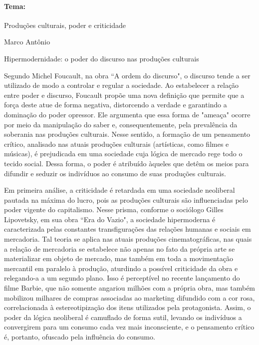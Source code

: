 \documentclass{article}
\begin{document}
\newpage
\paragraph{Tema:} Produções culturais, poder e criticidade

\begin{flushright} Marco Antônio \end{flushright}
 Hipermodernidade: o poder do discurso nas produções culturais


Segundo Michel Foucault, na obra “A ordem do discurso", o discurso tende a ser utilizado de modo a controlar e regular a sociedade. Ao estabelecer a relação entre poder e discurso, Foucault propõe uma nova definição que permite que a força deste atue de forma negativa, distorcendo a verdade e garantindo a dominação do poder opressor. Ele argumenta que essa forma de "ameaça" ocorre por meio da manipulação do saber e, consequentemente, pela prevalência da soberania nas produções culturais. Nesse sentido, a formação de um pensamento crítico, analisado nas atuais produções culturais (artísticas, como filmes e músicas), é prejudicada em uma sociedade cuja lógica de mercado rege todo o tecido social. Dessa forma, o poder é atribuído àqueles que detêm os meios para difundir e seduzir os indivíduos ao consumo de suas produções culturais.

Em primeira análise, a criticidade é retardada em uma sociedade neoliberal pautada na máxima do lucro, pois as produções culturais são influenciadas pelo poder vigente do capitalismo. Nesse prisma, conforme o sociólogo Gilles Lipovetsky, em sua obra “Era do Vazio", a sociedade hipermoderna é caracterizada pelas constantes transfigurações das relações humanas e sociais em mercadoria. Tal teoria se aplica nas atuais produções cinematográficas, nas quais a relação de mercadoria se estabelece não apenas no fato da própria arte se materializar em objeto de mercado, mas também em toda a movimentação mercantil em paralelo à produção, aturdindo a possível criticidade da obra e relegando-a a um segundo plano. Isso é perceptível no recente lançamento do filme Barbie, que não somente angariou milhões com a própria obra, mas também mobilizou milhares de compras associadas ao marketing difundido com a cor rosa, correlacionada à estereotipização dos itens utilizados pela protagonista. Assim, o poder da lógica neoliberal é camuflado de forma sutil, levando os indivíduos a convergirem para um consumo cada vez mais inconsciente, e o pensamento crítico é, portanto, ofuscado pela influência do consumo.
\end{document}
